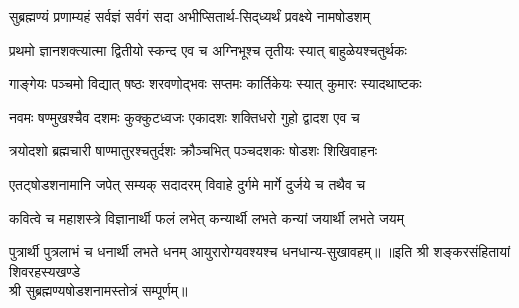 
\twolineshloka
{सुब्रह्मण्यं प्रणाम्यहं सर्वज्ञं सर्वगं सदा}
{अभीप्सितार्थ-सिद्‌ध्यर्थं प्रवक्ष्ये नामषोडशम्}

\twolineshloka
{प्रथमो ज्ञानशक्त्यात्मा द्वितीयो स्कन्द एव च}
{अग्निभूश्च तृतीयः स्यात् बाहुळेयश्चतुर्थकः}

\twolineshloka
{गाङ्गेयः पञ्चमो विद्यात् षष्ठः शरवणोद्भवः}
{सप्तमः कार्तिकेयः स्यात् कुमारः स्यादथाष्टकः}

\twolineshloka
{नवमः षण्मुखश्चैव दशमः कुक्कुटध्वजः}
{एकादशः शक्तिधरो गुहो द्वादश एव च}

\twolineshloka
{त्रयोदशो ब्रह्मचारी षाण्मातुरश्चतुर्दशः}
{क्रौञ्चभित् पञ्चदशकः षोडशः शिखिवाहनः}

\twolineshloka
{एतट्षोडशनामानि जपेत् सम्यक् सदादरम्}
{विवाहे दुर्गमे मार्गे दुर्जये च तथैव च}

\twolineshloka
{कवित्वे च महाशस्त्रे विज्ञानार्थी फलं लभेत्}
{कन्यार्थी लभते कन्यां जयार्थी लभते जयम्}

\twolineshloka
{पुत्रार्थी पुत्रलाभं  च धनार्थी लभते धनम्}
{आयुरारोग्यवश्यश्च धनधान्य-सुखावहम्॥}
॥इति श्री शङ्करसंहितायां शिवरहस्यखण्डे\\
श्री सुब्रह्मण्यषोडशनामस्तोत्रं सम्पूर्णम्॥